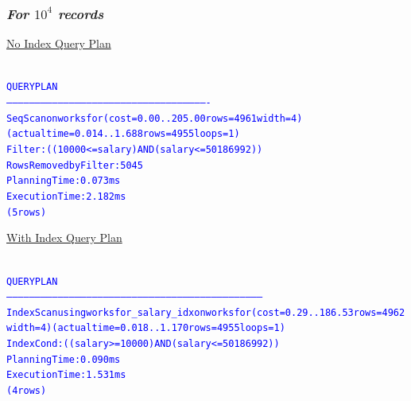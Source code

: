 \documentclass{article}
\begin{document}
    \subsubsection*{\emph{For $10^4$ records}}
    \underline{No Index Query Plan}
    \begin{center}
      {\tiny
      \begin{alltt}
      \textcolor{blue}{
        QUERY PLAN                                                
        ----------------------------------------------------------------------------------------------------------
         Seq Scan on worksfor  (cost=0.00..205.00 rows=4961 width=4) (actual time=0.014..1.688 rows=4955 loops=1)
           Filter: ((10000 <= salary) AND (salary <= 50186992))
           Rows Removed by Filter: 5045
         Planning Time: 0.073 ms
         Execution Time: 2.182 ms
        (5 rows)
       }
      \end{alltt}
      }
    \end{center}
    \underline{With Index Query Plan}
    \begin{center}
      {\tiny
      \begin{alltt}
      \textcolor{blue}{
        QUERY PLAN                                                              
        --------------------------------------------------------------------------------------------------------------------------------------
         Index Scan using worksfor_salary_idx on worksfor  (cost=0.29..186.53 rows=4962 width=4) (actual time=0.018..1.170 rows=4955 loops=1)
           Index Cond: ((salary >= 10000) AND (salary <= 50186992))
         Planning Time: 0.090 ms
         Execution Time: 1.531 ms
        (4 rows)
       }
      \end{alltt}
      }
    \end{center}
\end{document}
